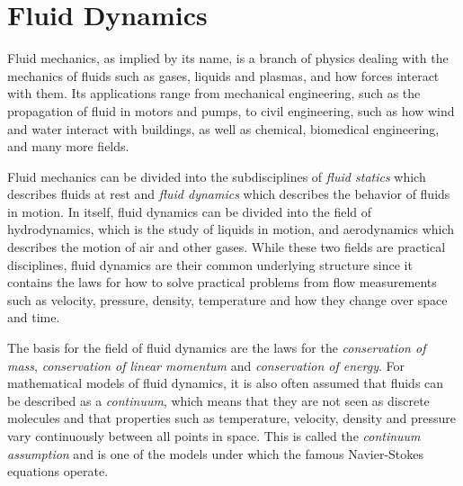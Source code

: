 \section{Fluid Dynamics}\label{sec:ns_eq}
Fluid mechanics, as implied by its name, is a branch of physics dealing with the mechanics of fluids such as gases, liquids and plasmas, and how forces interact with them. Its applications range from mechanical engineering, such as the propagation of fluid in motors and pumps, to civil engineering, such as how wind and water interact with buildings, as well as chemical, biomedical engineering, and many more fields.

Fluid mechanics can be divided into the subdisciplines of \textit{fluid statics} which describes fluids at rest and \textit{fluid dynamics} which describes the behavior of fluids in motion. In itself, fluid dynamics can be divided into the field of hydrodynamics, which is the study of liquids in motion, and aerodynamics which describes the motion of air and other gases. While these two fields are practical disciplines, fluid dynamics are their common underlying structure since it contains the laws for how to solve practical problems from flow measurements such as velocity, pressure, density, temperature and how they change over space and time.

The basis for the field of fluid dynamics are the laws for the \textit{conservation of mass}, \textit{conservation of linear momentum} and \textit{conservation of energy}. For mathematical models of fluid dynamics, it is also often assumed that fluids can be described as a \textit{continuum}, which means that they are not seen as discrete molecules and that properties such as temperature, velocity, density and pressure vary continuously between all points in space. This is called the \textit{continuum assumption} and is one of the models under which the famous Navier-Stokes equations operate.

\clearpage

